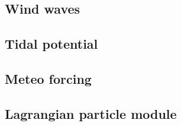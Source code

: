 \documentclass{report}
\newcommand{\todo}[1]{This section still has to be written by #1}
\begin{document}
		\subsection{Wind waves}
		

		\subsection{Tidal potential}
		

		\subsection{Meteo forcing}
		

		\subsection{Lagrangian particle module}
		






%	
%	

\end{document}
